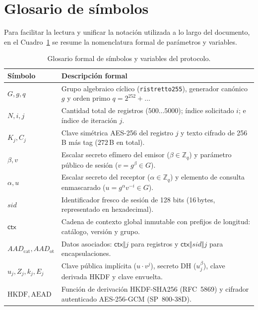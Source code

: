 \section{Glosario de s\'imbolos}
\label{sec:glosario}

Para facilitar la lectura y unificar la notaci\'on utilizada a lo largo del
documento, en el Cuadro~\ref{tab:glosario-simbolos} se resume la nomenclatura
formal de par\'ametros y variables.

\begin{table}[!ht]
\centering
\small
\begin{tabularx}{\textwidth}{@{}l X@{}}
\toprule
S\'imbolo & Descripci\'on formal \\
\midrule
$G, g, q$ & Grupo algebraico c\'iclico (\texttt{ristretto255}), generador can\'onico $g$ y orden primo $q = 2^{252}+\dots$ \\
$N, i, j$ & Cantidad total de registros ($500 \dots 5000$); \'indice solicitado $i$; e \'indice de iteraci\'on $j$. \\
$K_j, C_j$ & Clave sim\'etrica AES-256 del registro $j$ y texto cifrado de 256\,B m\'as tag ($272$\,B en total). \\
$\beta, v$ & Escalar secreto ef\'imero del emisor ($\beta \in \mathbb{Z}_q$) y par\'ametro p\'ublico de sesi\'on ($v = g^\beta \in G$). \\
$\alpha, u$ & Escalar secreto del receptor ($\alpha \in \mathbb{Z}_q$) y elemento de consulta enmascarado ($u = g^\alpha v^{-i} \in G$). \\
$sid$ & Identificador fresco de sesi\'on de 128 bits (16\,bytes, representado en hexadecimal). \\
$\mathsf{ctx}$ & Cadena de contexto global inmutable con prefijos de longitud: cat\'alogo, versi\'on y grupo. \\
$AAD_{\mathrm{cat}}, AAD_{\mathrm{ot}}$ & Datos asociados: $\mathsf{ctx}\Vert j$ para registros y $\mathsf{ctx}\Vert sid\Vert j$ para encapsulaciones. \\
$u_j, Z_j, k_j, E_j$ & Clave p\'ublica impl\'icita ($u\cdot v^j$), secreto DH ($u_j^\beta$), clave derivada HKDF y clave envuelta. \\
$\mathrm{HKDF}, \mathrm{AEAD}$ & Funci\'on de derivaci\'on HKDF-SHA256 (RFC~5869) y cifrador autenticado AES-256-GCM (SP~800-38D). \\
\bottomrule
\end{tabularx}
\caption{Glosario formal de s\'imbolos y variables del protocolo.}
\label{tab:glosario-simbolos}
\end{table}

